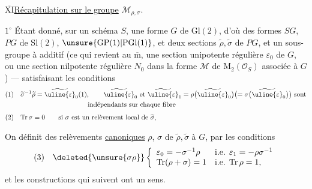 



\uline{$\overline{\mathrm{XI}}$}\quad\uline{Récapitulation sur le groupe} $\mathcal{M}_{\rho,\sigma}$.


\textcircled{$1^\circ$} Étant donné, sur un schéma $S$, une forme $G$ de $\mathrm{Gl}(2)$, d'où des formes $SG$, $PG$ de $\mathrm{Sl}(2)$, $\unsure{\mathrm{GP}(1)|\mathrm{PGl}(1)}$, et deux sections $\widetilde\rho,\widetilde\sigma$ de $PG$, et un sous-groupe à   additif 
(ce qui revient au $\overline{\mathrm m}$, une section  unipotente régulière  $\varepsilon_0$ de $G$, ou une section nilpotente régulière $N_0$ dans la forme $\mathcal M$ de $\mathrm{M}_2(\mathcal O_S)$ associée à $G$) --- satisfaisant les conditions
\[
\begin{aligned}
(1)\quad &\widetilde\sigma^{-1}\widetilde\rho
  =\widetilde{\uline{\varepsilon}}_0(1),\qquad
  \widetilde{\uline{\varepsilon}}_0\text{ et }
  \widetilde{\uline{\varepsilon}}_1
  =\rho\bigl(\widetilde{\uline{\varepsilon}}_0\bigr)
  \bigl(=\sigma\bigl(\widetilde{\uline{\varepsilon}}_0\bigr)\bigr)
  \text{ sont}\\
 &\hspace{10em}\text{indépendants sur chaque fibre}\\[4pt]
(2)\quad &\mathrm{Tr}\,\sigma=0\qquad
 \text{si }\sigma\text{ est un relèvement local de }\widetilde\sigma,
\end{aligned}
\]

On définit des relèvements \uline{canoniques} $\rho$, $\sigma$ de $\widetilde\rho,\widetilde\sigma$ à $G$,  par les conditions
\[
(3)\quad\deleted{\unsure{\sigma\rho}}
\left\{\begin{array}{ll}
 \varepsilon_0=-\sigma^{-1}\rho
 &\text{i.e. }\varepsilon_1=-\rho\sigma^{-1}\\
 \mathrm{Tr}(\rho+\sigma)=1
 &\text{i.e. }\mathrm{Tr}\,\rho=1,
\end{array}\right.
\]
et les constructions qui suivent ont un sens.

